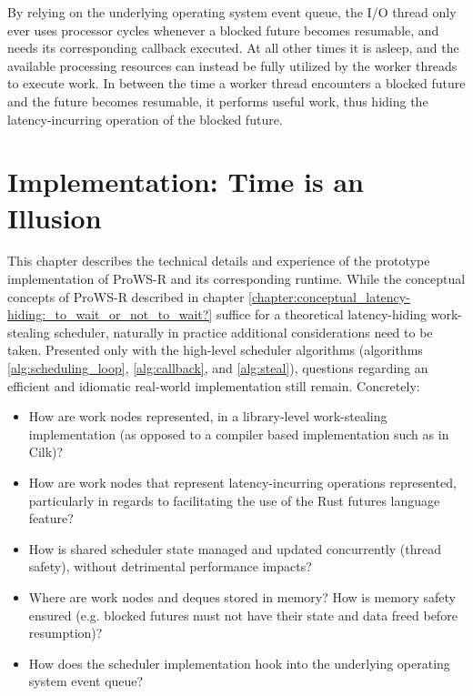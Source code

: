 \documentclass[bsc,frontabs,singlespacing,parskip,deptreport,normalheadings]{infthesis}
\begin{document}
By relying on the underlying operating system event queue, the I/O thread only
ever uses processor cycles whenever a blocked future becomes resumable, and
needs its corresponding callback executed. At all other times it is asleep, and
the available processing resources can instead be fully utilized by the worker
threads to execute work. In between the time a worker thread encounters a
blocked future and the future becomes resumable, it performs useful work, thus
hiding the latency-incurring operation of the blocked future.


\chapter{Implementation: Time is an Illusion}
\label{chapter:implementation:_time_is_an_illusion}

This chapter describes the technical details and experience of the prototype
implementation of ProWS-R and its corresponding runtime. While the conceptual
concepts of ProWS-R described in chapter
\ref{chapter:conceptual_latency-hiding:_to_wait_or_not_to_wait?} suffice for a
theoretical latency-hiding work-stealing scheduler, naturally in practice
additional considerations need to be taken. Presented only with the high-level
scheduler algorithms (algorithms \ref{alg:scheduling_loop}, \ref{alg:callback},
and \ref{alg:steal}), questions regarding an efficient and idiomatic real-world
implementation still remain. Concretely:

\begin{itemize}
    \item How are work nodes represented, in a library-level work-stealing
        implementation (as opposed to a compiler based implementation such as in
        Cilk)?
    \item How are work nodes that represent latency-incurring operations
        represented, particularly in regards to facilitating the use of the Rust
        futures language feature?
    \item How is shared scheduler state managed and updated concurrently (thread
        safety), without detrimental performance impacts?
    \item Where are work nodes and deques stored in memory? How is memory safety
        ensured (e.g. blocked futures must not have their state and data freed
        before resumption)?
    \item How does the scheduler implementation hook into the underlying
        operating system event queue?
\end{itemize}
\end{document}
